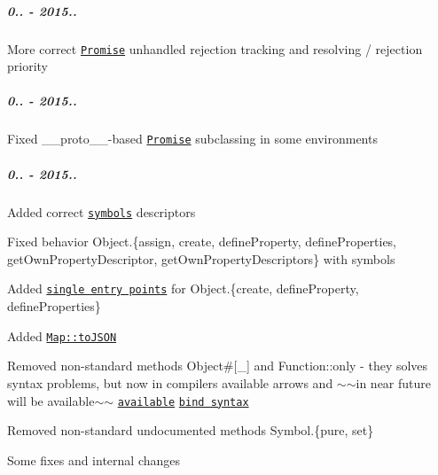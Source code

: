 \subparagraph*{0.. -\/ 2015..}


\begin{DoxyItemize}
\item More correct \href{https://github.com/zloirock/core-js/#ecmascript-6-promise}{\tt {\ttfamily Promise}} unhandled rejection tracking and resolving / rejection priority
\end{DoxyItemize}

\subparagraph*{0.. -\/ 2015..}


\begin{DoxyItemize}
\item Fixed {\ttfamily \+\_\+\+\_\+proto\+\_\+\+\_\+}-\/based \href{https://github.com/zloirock/core-js/#ecmascript-6-promise}{\tt {\ttfamily Promise}} subclassing in some environments
\end{DoxyItemize}

\subparagraph*{0.. -\/ 2015..}


\begin{DoxyItemize}
\item Added correct \href{https://github.com/zloirock/core-js/#ecmascript-6-symbol}{\tt symbols} descriptors
\begin{DoxyItemize}
\item Fixed behavior {\ttfamily Object.\{assign, create, define\+Property, define\+Properties, get\+Own\+Property\+Descriptor, get\+Own\+Property\+Descriptors\}} with symbols
\item Added \href{https://github.com/zloirock/core-js/#commonjs}{\tt single entry points} for {\ttfamily Object.\{create, define\+Property, define\+Properties\}}
\end{DoxyItemize}
\item Added \href{https://github.com/zloirock/core-js/#ecmascript-7-proposals}{\tt {\ttfamily Map\+::to\+J\+S\+ON}}
\item Removed non-\/standard methods {\ttfamily Object\#\mbox{[}\+\_\+\mbox{]}} and {\ttfamily Function\+::only} -\/ they solves syntax problems, but now in compilers available arrows and $\sim$$\sim$in near future will be available$\sim$$\sim$ \href{http://babeljs.io/blog/2015/05/14/function-bind/}{\tt available} \href{https://github.com/zenparsing/es-function-bind}{\tt bind syntax}
\item Removed non-\/standard undocumented methods {\ttfamily Symbol.\{pure, set\}}
\item Some fixes and internal changes
\end{DoxyItemize}

